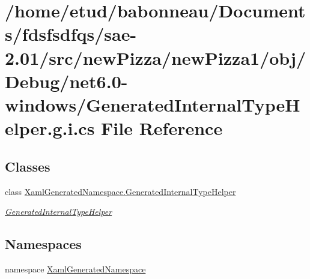 \hypertarget{net6_80-windows_2GeneratedInternalTypeHelper_8g_8i_8cs}{}\section{/home/etud/babonneau/\+Documents/fdsfsdfqs/sae-\/2.01/src/new\+Pizza/new\+Pizza1/obj/\+Debug/net6.0-\/windows/\+Generated\+Internal\+Type\+Helper.g.\+i.\+cs File Reference}
\label{net6_80-windows_2GeneratedInternalTypeHelper_8g_8i_8cs}
\subsection*{Classes}
\begin{DoxyCompactItemize}
\item 
class \hyperlink{classXamlGeneratedNamespace_1_1GeneratedInternalTypeHelper}{Xaml\+Generated\+Namespace.\+Generated\+Internal\+Type\+Helper}
\begin{DoxyCompactList}\small\item\em \hyperlink{classXamlGeneratedNamespace_1_1GeneratedInternalTypeHelper}{Generated\+Internal\+Type\+Helper} \end{DoxyCompactList}\end{DoxyCompactItemize}
\subsection*{Namespaces}
\begin{DoxyCompactItemize}
\item 
namespace \hyperlink{namespaceXamlGeneratedNamespace}{Xaml\+Generated\+Namespace}
\end{DoxyCompactItemize}
